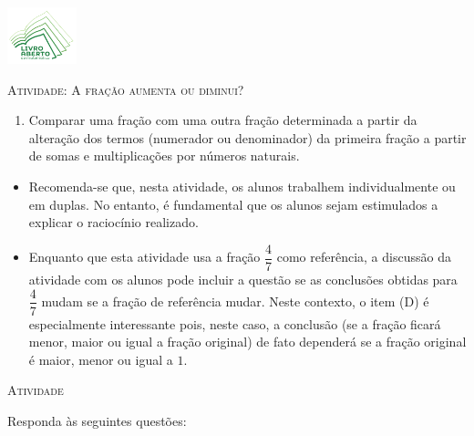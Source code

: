 \documentclass[10 pt,usenames,dvipsnames, oneside]{article}
\begin{document}
\begin{center}
  \begin{minipage}[l]{3cm}
\includegraphics[width=2cm]{../../../Figuras/logo}       
\end{minipage}\hfill
\begin{minipage}[r]{.8\textwidth}
 {\Large \scshape Atividade: A fração aumenta ou diminui?}  
\end{minipage}
\end{center}
\vspace{.2cm}

\ifdefined\prof
\begin{goals}
\begin{enumerate}
\item       Comparar uma fração com uma outra fração determinada a partir da
alteração dos termos (numerador ou denominador) da primeira fração a partir de
somas e multiplicações por números naturais.
\end{enumerate}

\tcblower

\begin{itemize}
\item       Recomenda-se que, nesta atividade, os alunos trabalhem
individualmente ou em duplas. No entanto, é fundamental que os alunos sejam
estimulados a explicar o raciocínio realizado.
\item       Enquanto que esta atividade usa a fração       $\dfrac{4}{7}$
como referência, a discussão da atividade com os alunos pode incluir a questão
se as conclusões obtidas para       $\dfrac{4}{7}$       mudam se a fração de
referência mudar. Neste contexto, o item (D) é especialmente interessante pois,
neste caso, a conclusão (se a fração ficará menor, maior ou igual a fração
original) de fato dependerá se a fração original é maior, menor ou igual a
$1$.
\end{itemize}
\end{goals}

\bigskip
\begin{center}
{\large \scshape Atividade}
\end{center}
\fi

Responda às seguintes questões:
\end{document}
